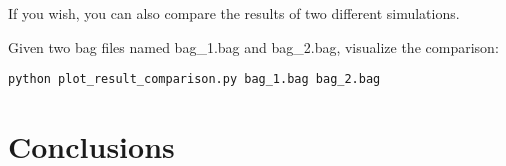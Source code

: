 \documentclass[11pt,a4paper]{article}
\begin{document}
If you wish, you can also compare the results of two different simulations.

Given two bag files named bag\_1.bag and bag\_2.bag, visualize the comparison:
\begin{lstlisting}
python plot_result_comparison.py bag_1.bag bag_2.bag
\end{lstlisting}



\section{Conclusions}
\end{document}
